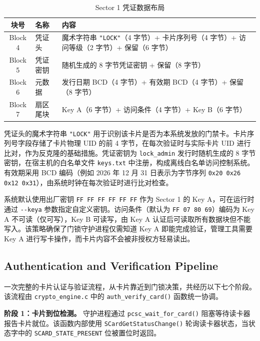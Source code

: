 \documentclass[sigconf]{acmart}
\begin{document}
\begin{table}[H]
\centering
\caption{Sector 1 凭证数据布局}
\label{tab:credential_layout}
\begin{tabular}{@{}clp{5cm}@{}}
\toprule
\textbf{块号} & \textbf{名称} & \textbf{内容} \\
\midrule
Block 4 & 凭证头 & 魔术字符串 \texttt{"LOCK"}（4 字节）+ 卡片序列号（4 字节）+ 访问等级（2 字节）+ 保留（6 字节）\\
Block 5 & 凭证密钥 & 随机生成的 8 字节凭证密钥 + 保留（8 字节）\\
Block 6 & 元数据 & 发行日期 BCD（4 字节）+ 有效期 BCD（4 字节）+ 保留（8 字节）\\
Block 7 & 扇区尾块 & Key A（6 字节）+ 访问条件（4 字节）+ Key B（6 字节）\\
\bottomrule
\end{tabular}
\end{table}

凭证头的魔术字符串 \texttt{"LOCK"} 用于识别该卡片是否为本系统发放的门禁卡。卡片序列号字段存储了卡片物理 UID 的前 4 字节，在每次验证时与实际卡片 UID 进行比对，作为反克隆的基础措施。凭证密钥为 \texttt{lock\_admin} 发行时随机生成的 8 字节密钥，在宿主机的白名单文件 \texttt{keys.txt} 中注册，构成离线白名单访问控制系统。有效期采用 BCD 编码（例如 2026 年 12 月 31 日表示为字节序列 \texttt{0x20 0x26 0x12 0x31}），由系统时钟在每次验证时进行比对检查。

系统默认使用出厂密钥 \texttt{FF FF FF FF FF FF} 作为 Sector 1 的 Key A，可在运行时通过 \texttt{-{}-keya} 参数指定自定义密钥。访问条件（默认为 \texttt{FF 07 80 69}）编码为 Key A 不可读（仅可写），Key B 可读写，由 Key A 认证后可读取所有数据块但不能写入。该策略确保了门锁守护进程仅需知道 Key A 即能完成验证，管理工具需要 Key A 进行写卡操作，而卡片内容不会被非授权方轻易读出。

\subsection{Authentication and Verification Pipeline}
\label{subsec:auth_flow}

一次完整的卡片认证与验证流程，从卡片靠近到门锁决策，共经历以下七个阶段。该流程由 \texttt{crypto\_engine.c} 中的 \texttt{auth\_verify\_card()} 函数统一协调。

\textbf{阶段 1：卡片到位检测。} 守护进程通过 \texttt{pcsc\_wait\_for\_card()} 阻塞等待读卡器报告卡片就位。该函数内部使用 \texttt{SCardGetStatusChange()} 轮询读卡器状态，当状态字中的 \texttt{SCARD\_STATE\_PRESENT} 位被置位时返回。
\end{document}
